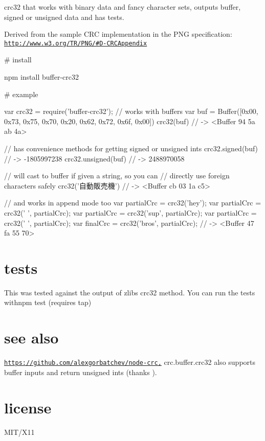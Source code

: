 \href{http://travis-ci.org/brianloveswords/buffer-crc32}{\tt }

crc32 that works with binary data and fancy character sets, outputs buffer, signed or unsigned data and has tests.

Derived from the sample C\+RC implementation in the P\+NG specification\+: \href{http://www.w3.org/TR/PNG/#D-CRCAppendix}{\tt http\+://www.\+w3.\+org/\+T\+R/\+P\+N\+G/\#\+D-\/\+C\+R\+C\+Appendix}

\# install 
\begin{DoxyCode}
npm install buffer-crc32
\end{DoxyCode}


\# example 
\begin{DoxyCode}
var crc32 = require('buffer-crc32');
// works with buffers
var buf = Buffer([0x00, 0x73, 0x75, 0x70, 0x20, 0x62, 0x72, 0x6f, 0x00])
crc32(buf) // -> <Buffer 94 5a ab 4a>

// has convenience methods for getting signed or unsigned ints
crc32.signed(buf) // -> -1805997238
crc32.unsigned(buf) // -> 2488970058

// will cast to buffer if given a string, so you can
// directly use foreign characters safely
crc32('自動販売機') // -> <Buffer cb 03 1a c5>

// and works in append mode too
var partialCrc = crc32('hey');
var partialCrc = crc32(' ', partialCrc);
var partialCrc = crc32('sup', partialCrc);
var partialCrc = crc32(' ', partialCrc);
var finalCrc = crc32('bros', partialCrc); // -> <Buffer 47 fa 55 70>
\end{DoxyCode}


\section*{tests}

This was tested against the output of zlib\textquotesingle{}s crc32 method. You can run the tests with{\ttfamily npm test} (requires tap)

\section*{see also}

\href{https://github.com/alexgorbatchev/node-crc,}{\tt https\+://github.\+com/alexgorbatchev/node-\/crc,} {\ttfamily crc.\+buffer.\+crc32} also supports buffer inputs and return unsigned ints (thanks ).

\section*{license}

M\+I\+T/\+X11 